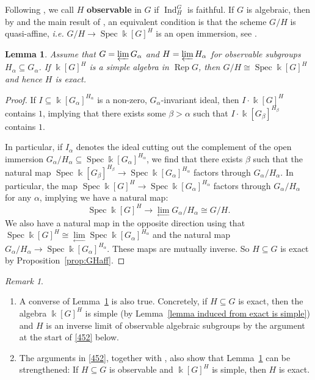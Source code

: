 \documentclass[11pt]{amsart}
\def\Ind{\operatorname{Ind}}
\def\bk{\Bbbk}
\def\Rep{\operatorname{Rep}}
\def\Spec{\operatorname{Spec}}
\def\sub{\subseteq}
\newtheorem{lemma}[thm]{Lemma}
\theoremstyle{definition}
\theoremstyle{remark}
\newtheorem{remark}[thm]{Remark}
\numberwithin{equation}{section}
\begin{document}
	
Following \cite[Definition~7.5.2]{C1}, we call $H$ {\bf observable} in $G$ if $\Ind^G_H$ is faithful. If $G$ is algebraic, then by \cite[Theorem~7.3.1]{C2} and the main result of \cite{CS}, an equivalent condition is that the scheme $G/H$ is quasi-affine, {\it i.e.} $G/H\to \Spec \bk[G]^H$ is an open immersion, see \cite[\S 5.4]{C2}.


	\begin{lemma}
	\label{thm simp meand ex}
    Assume that $G=\varprojlim G_\alpha$ and $H=\varprojlim H_\alpha$ for observable subgroups $H_\alpha\sub G_\alpha$.
		If $\Bbbk[G]^H$ is a simple algebra in $\Rep G$, then ${G/H}\cong\Spec\Bbbk[G]^H$ and hence $H$ is exact.
	\end{lemma}
\begin{proof}
    If $I\sub\Bbbk[G_{\alpha}]^{H_{\alpha}}$ is a non-zero, $G_{\alpha}$-invariant ideal, then $I\cdot\Bbbk[G]^H$ contains $1$, implying that there exists some $\beta>\alpha$ such that $I\cdot\Bbbk[G_{\beta}]^{H_{\beta}}$ contains $1$.  
	
	In particular, if $I_{\alpha}$ denotes the ideal cutting  out the complement of the open immersion $G_{\alpha}/H_{\alpha}\sub\Spec\Bbbk[G_{\alpha}]^{H_{\alpha}}$, we find that there exists $\beta$ such that the natural map $\Spec\Bbbk[G_{\beta}]^{H_{\beta}}\to\Spec\Bbbk[G_{\alpha}]^{H_{\alpha}}$ factors through $G_{\alpha}/H_{\alpha}$.  In particular, the map $\Spec\Bbbk[G]^H\to\Spec\Bbbk[G_{\alpha}]^{H_{\alpha}}$ factors through $G_{\alpha}/H_{\alpha}$ for any $\alpha$, implying we have a natural map:
	\[
	\Spec\Bbbk[G]^H\to\lim\limits_{\leftarrow}{G_{\alpha}/H_{\alpha}}\cong{G/H}.
	\]
	We also have a natural map in the opposite direction using that $\Spec\Bbbk[G]^H\cong\lim\limits_{\leftarrow}\Spec\Bbbk[G_{\alpha}]^{H_{\alpha}}$ and the natural map $G_{\alpha}/H_{\alpha}\to \Spec\Bbbk[G_{\alpha}]^{H_{\alpha}}$.  These maps are mutually inverse.
    So $H\sub G$ is exact by Proposition~\ref{prop:GHaff}.
\end{proof}

\begin{remark}
    \begin{enumerate}
        \item  A converse of Lemma~\ref{thm simp meand ex} is also true. Concretely, if $H\sub G$ is exact, then the algebra $\bk[G]^H$ is simple (by Lemma~\ref{lemma induced from exact is simple}) and $H$ is an inverse limit of observable algebraic subgroups by the argument at the start of \ref{452} below.
        \item The arguments in \ref{452}, together with \cite[Proposition~7.5.3]{C1}, also show that Lemma~\ref{thm simp meand ex} can be strengthened: If $H\sub G$ is observable and $\bk[G]^H$ is simple, then $H$ is exact. 
    \end{enumerate}
\end{remark}
\end{document}
